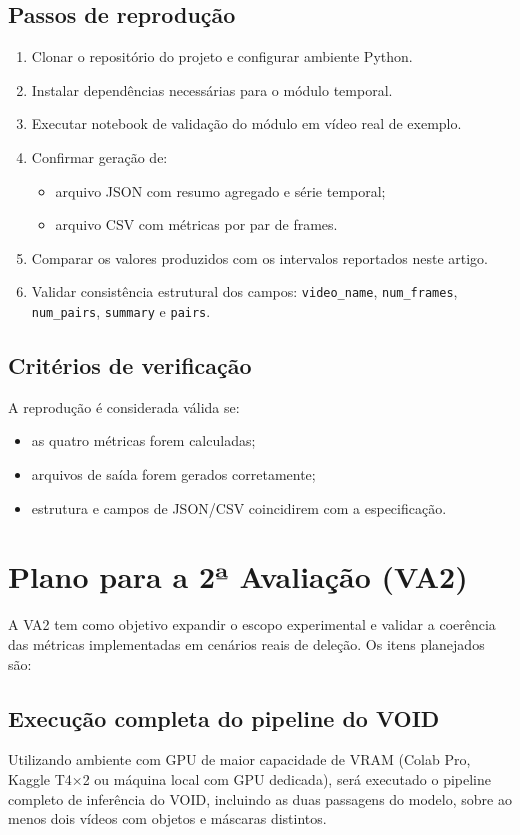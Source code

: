 \documentclass[conference]{IEEEtran}
\begin{document}
\subsection{Passos de reprodução}
\begin{enumerate}
    \item Clonar o repositório do projeto e configurar ambiente Python.
    \item Instalar dependências necessárias para o módulo temporal.
    \item Executar notebook de validação do módulo em vídeo real de exemplo.
    \item Confirmar geração de:
    \begin{itemize}
        \item arquivo JSON com resumo agregado e série temporal;
        \item arquivo CSV com métricas por par de frames.
    \end{itemize}
    \item Comparar os valores produzidos com os intervalos reportados neste artigo.
    \item Validar consistência estrutural dos campos:
    \texttt{video\_name}, \texttt{num\_frames}, \texttt{num\_pairs}, \texttt{summary} e \texttt{pairs}.
\end{enumerate}

\subsection{Critérios de verificação}
A reprodução é considerada válida se:
\begin{itemize}
    \item as quatro métricas forem calculadas;
    \item arquivos de saída forem gerados corretamente;
    \item estrutura e campos de JSON/CSV coincidirem com a especificação.
\end{itemize}

\section{Plano para a 2ª Avaliação (VA2)}

A VA2 tem como objetivo expandir o escopo experimental e validar a coerência das métricas implementadas em cenários reais de deleção. Os itens planejados são:

\subsection{Execução completa do pipeline do VOID}
Utilizando ambiente com GPU de maior capacidade de VRAM (Colab Pro, Kaggle T4×2 ou máquina local com GPU dedicada), será executado o pipeline completo de inferência do VOID, incluindo as duas passagens do modelo, sobre ao menos dois vídeos com objetos e máscaras distintos.
\end{document}
